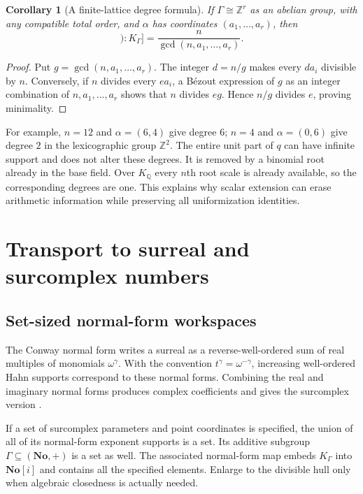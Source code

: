 \documentclass[11pt,letterpaper]{article}
\newtheorem{corollary}[corollary]{Corollary}
\theoremstyle{definition}
\newcommand{\Q}{\mathbb Q}
\newcommand{\Z}{\mathbb Z}
\newcommand{\No}{\mathbf{No}}
\begin{document}
\begin{corollary}[A finite-lattice degree formula]\label{tate:cor:lattice}
If $\Gamma\cong\Z^r$ as an abelian group, with any compatible total
order, and $\alpha$ has coordinates $(a_1,\dots,a_r)$, then
\begin{equation}
 [K_\Gamma(E_q[n]):K_\Gamma]
      =\frac{n}{\gcd(n,a_1,\dots,a_r)}.\label{tate:eq:gcddegree}
\end{equation}
\end{corollary}

\begin{proof}
Put $g=\gcd(n,a_1,\ldots,a_r)$. The integer $d=n/g$ makes every
$da_i$ divisible by $n$. Conversely, if $n$ divides every $ea_i$,
a B\'ezout expression of $g$ as an integer combination of $n,a_1,\ldots,a_r$
shows that $n$ divides $eg$. Hence $n/g$ divides $e$, proving minimality.
\end{proof}

For example, $n=12$ and $\alpha=(6,4)$ give degree $6$; $n=4$ and
$\alpha=(0,6)$ give degree $2$ in the lexicographic group $\Z^2$.
The entire unit part of $q$ can have infinite support and does not
alter these degrees. It is removed by a binomial root already in the
base field. Over $K_\Q$ every $n$th root scale is already available,
so the corresponding degrees are one. This explains why scalar
extension can erase arithmetic information while preserving all
uniformization identities.

\section{Transport to surreal and surcomplex numbers}\label{tate:sec:surcomplex}

\subsection{Set-sized normal-form workspaces}

The Conway normal form writes a surreal as a reverse-well-ordered sum
of real multiples of monomials $\omega^\gamma$. With the convention
$t^\gamma=\omega^{-\gamma}$, increasing well-ordered Hahn supports
correspond to these normal forms. Combining the real and imaginary
normal forms produces complex coefficients and gives the surcomplex
version \cite{Gonshor,BournezGuilmant}.

If a set of surcomplex parameters and point coordinates is specified,
the union of all of its normal-form exponent supports is a set. Its
additive subgroup $\Gamma\subseteq(\No,+)$ is a set as well. The
associated normal-form map embeds $K_\Gamma$ into $\No[i]$ and contains
all the specified elements. Enlarge to the divisible hull only when
algebraic closedness is actually needed.
\end{document}
